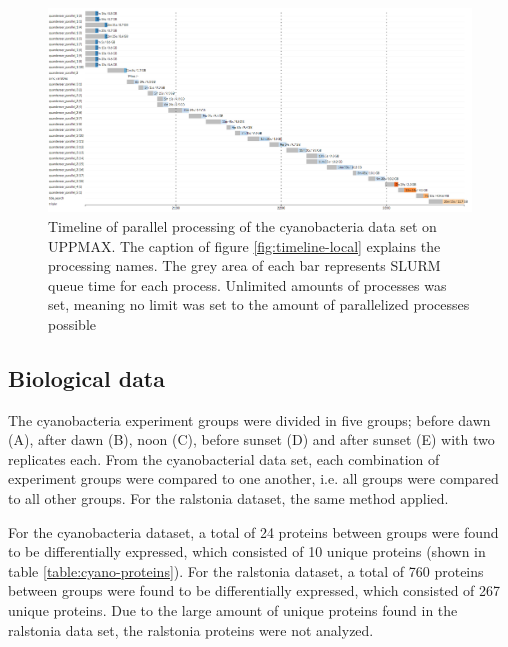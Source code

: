 \begin{figure}[H]
  \includegraphics[width=\linewidth]{results/timeline-cluster.png}
  \caption{Timeline of parallel processing of the cyanobacteria data set on UPPMAX. The caption of figure \ref{fig:timeline-local} explains the processing names. The grey area of each bar represents SLURM queue time for each process. Unlimited amounts of processes was set, meaning no limit was set to the amount of parallelized processes possible}
  \label{fig:timeline-cluster}
\end{figure}

\subsection{Biological data}

The cyanobacteria experiment groups were divided in five groups; before dawn (A), after dawn (B), noon (C), before sunset (D) and after sunset (E) with two replicates each. From the cyanobacterial data set, each combination of experiment groups were compared to one another, i.e. all groups were compared to all other groups. For the ralstonia dataset, the same method applied.

For the cyanobacteria dataset, a total of 24 proteins between groups were found to be differentially expressed, which consisted of 10 unique proteins (shown in table \ref{table:cyano-proteins}). For the ralstonia dataset, a total of 760 proteins between groups were found to be differentially expressed, which consisted of 267 unique proteins. Due to the large amount of unique proteins found in the ralstonia data set, the ralstonia proteins were not analyzed.

